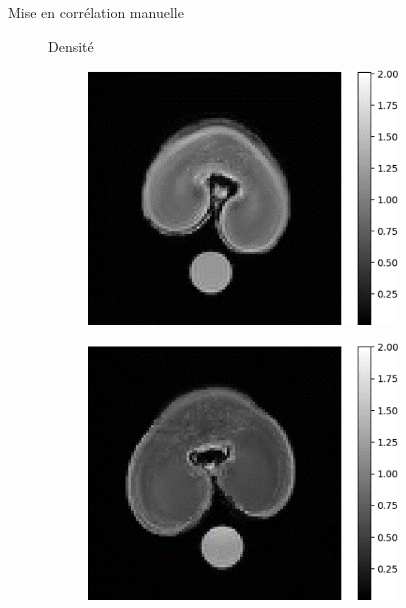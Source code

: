 \documentclass[10pt]{beamer}
\begin{document}
\begin{frame}{Mise en corrélation manuelle}
   \begin{figure}[ht]
     \centering
     Densité
    \begin{subfigure}[c]{0.33\textwidth}
      \centering
      \includegraphics[width=0.9\textwidth]{fig/manualcorr_irm250_density.png}
      \caption{}
      \label{subfig:manualcorr_irm250_density.png}
    \end{subfigure}%
    \begin{subfigure}[c]{0.33\textwidth}
      \centering
      \includegraphics[width=0.9\textwidth]{fig/manualcorr_irm650_density}
      \caption{}
      \label{subfig:manualcorr_irm650_density}
    \end{subfigure}


\end{figure}
\end{frame}
\end{document}
